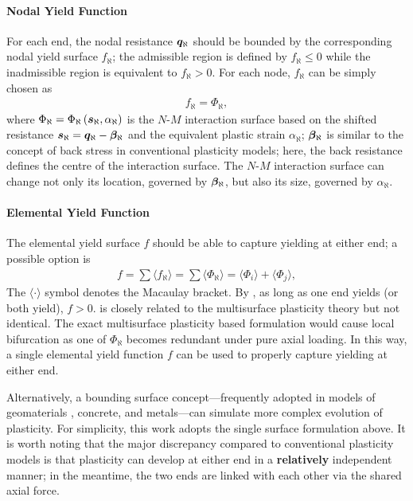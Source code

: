 \paragraph{Nodal Yield Function}
For each end, the nodal resistance $\bm{q}_\aleph$ should be bounded by the corresponding nodal yield surface $f_\aleph$; the admissible region is defined by $f_\aleph\leqslant0$ while the inadmissible region is equivalent to $f_\aleph>0$.
For each node, $f_\aleph$ can be simply chosen as
\begin{gather}
f_\aleph=\Phi_\aleph,
\end{gather}
where $\Phi_\aleph=\Phi_\aleph\left(\bm{s}_\aleph,\alpha_\aleph\right)$ is the $N$-$M$ interaction surface based on the shifted resistance $\bm{s}_\aleph=\bm{q}_\aleph-\bm{\beta}_\aleph$ and the equivalent plastic strain $\alpha_\aleph$; $\bm{\beta}_\aleph$ is similar to the concept of back stress in conventional plasticity models; here, the back resistance defines the centre of the interaction surface.
The $N$-$M$ interaction surface can change not only its location, governed by $\bm{\beta}_\aleph$, but also its size, governed by $\alpha_\aleph$.
\paragraph{Elemental Yield Function}
The elemental yield surface $f$ should be able to capture yielding at either end; a possible option is
\begin{gather}\label{eq:nm_yield}
f=\sum{}\langle{}f_\aleph\rangle=\sum\langle\Phi_\aleph\rangle=\langle\Phi_i\rangle+\langle\Phi_j\rangle,
\end{gather}
The $\langle\cdot\rangle$ symbol denotes the Macaulay bracket.
By , as long as one end yields (or both yield), $f>0$.
 is closely related to the multisurface plasticity theory \cite{Simo1998} but not identical.
The exact multisurface plasticity based formulation \cite{Kostic2013} would cause local bifurcation as one of $\Phi_\aleph$ becomes redundant under pure axial loading.
In this way, a single elemental yield function $f$ can be used to properly capture yielding at either end.

Alternatively, a bounding surface concept---frequently adopted in models of geomaterials \cite{Dafalias2004}, concrete, and metals---can simulate more complex evolution of plasticity.
For simplicity, this work adopts the single surface formulation above.
It is worth noting that the major discrepancy compared to conventional plasticity models is that plasticity can develop at either end in a \textbf{relatively} independent manner; in the meantime, the two ends are linked with each other via the shared axial force.

